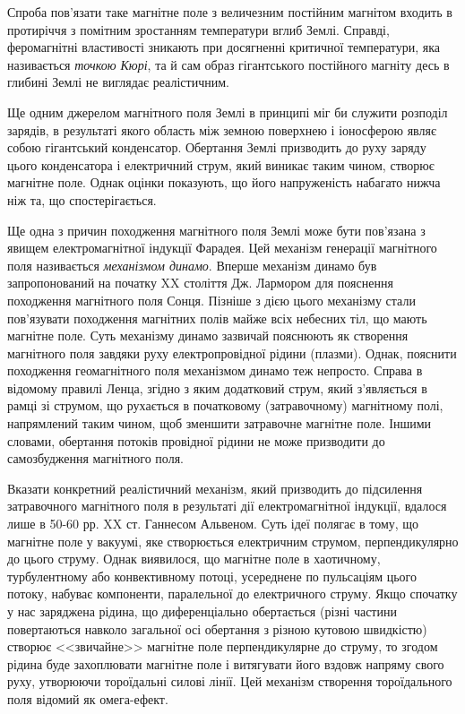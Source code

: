 Спроба пов'язати таке магнітне поле з величезним постійним магнітом входить в протиріччя з помітним зростанням температури вглиб Землі. Справді, феромагнітні властивості зникають при досягненні критичної температури, яка називається \emph{точкою Кюрі}, та й сам образ гігантського постійного магніту десь в глибині Землі не виглядає реалістичним.

Ще одним джерелом магнітного поля Землі в принципі міг би служити розподіл зарядів, в результаті якого область між земною поверхнею і іоносферою являє собою гігантський конденсатор. Обертання Землі призводить до руху заряду цього конденсатора і електричний струм, який виникає таким чином, створює магнітне поле. Однак оцінки показують, що його напруженість набагато нижча ніж та, що спостерігається.

Ще одна з причин походження магнітного поля Землі може бути пов'язана з явищем електромагнітної індукції Фарадея. Цей механізм генерації магнітного поля називається \emph{механізмом динамо}. Вперше механізм динамо був запропонований на початку XX століття  Дж. Лармором для пояснення походження магнітного поля Сонця. Пізніше з дією цього механізму стали пов'язувати походження магнітних полів майже всіх небесних тіл, що мають магнітне поле. Суть механізму динамо зазвичай пояснюють як створення магнітного поля завдяки руху електропровідної рідини (плазми). Однак, пояснити походження геомагнітного поля механізмом динамо теж непросто. Справа в відомому правилі Ленца, згідно з яким додатковий струм, який з'являється в рамці зі струмом, що рухається в початковому (затравочному) магнітному полі, напрямлений таким чином, щоб зменшити затравочне магнітне поле. Іншими словами, обертання потоків провідної рідини не може призводити до самозбудження магнітного поля.

Вказати конкретний реалістичний механізм, який призводить до підсилення затравочного магнітного поля в результаті дії електромагнітної індукції, вдалося лише в 50-60 рр. XX ст. Ганнесом Альвеном. Суть ідеї полягає в тому, що магнітне поле у вакуумі, яке створюється електричним струмом, перпендикулярно до цього струму. Однак виявилося, що магнітне поле в хаотичному, турбулентному або конвективному потоці, усереднене по пульсаціям цього потоку, набуває компоненти, паралельної до електричного струму. Якщо спочатку у нас заряджена рідина, що диференціально обертається (різні частини повертаються навколо загальної осі обертання з різною кутовою швидкістю) створює <<звичайне>> магнітне поле перпендикулярне до струму, то згодом рідина буде захоплювати магнітне поле і витягувати його вздовж напряму свого руху, утворюючи тороїдальні силові лінії. Цей механізм створення тороїдального поля відомий як омега-ефект.

